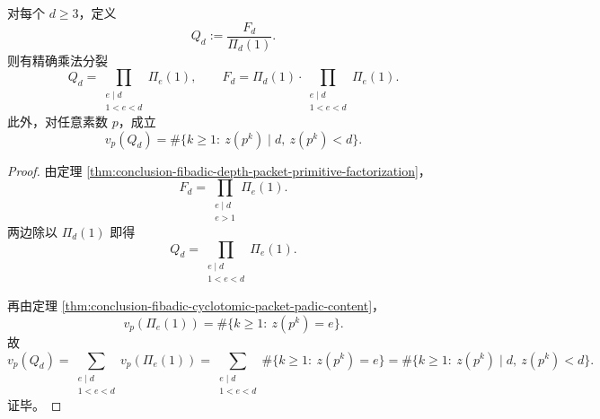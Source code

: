 \begin{theorem}[导体预算的乘法分裂]\label{thm:conclusion-fibadic-conductor-budget-new-old-splitting}
对每个 \(d\ge 3\)，定义
\[
Q_d:=\frac{F_d}{\Pi_d(1)}.
\]
则有精确乘法分裂
\[
Q_d=\prod_{\substack{e\mid d\\ 1<e<d}}\Pi_e(1),
\qquad
F_d=\Pi_d(1)\cdot \prod_{\substack{e\mid d\\ 1<e<d}}\Pi_e(1).
\]
此外，对任意素数 \(p\)，成立
\[
v_p(Q_d)
=
\#\{k\ge 1:\ z(p^k)\mid d,\ z(p^k)<d\}.
\]
\end{theorem}
\begin{proof}
由定理 \ref{thm:conclusion-fibadic-depth-packet-primitive-factorization}，
\[
F_d=\prod_{\substack{e\mid d\\ e>1}}\Pi_e(1).
\]
两边除以 \(\Pi_d(1)\) 即得
\[
Q_d=\prod_{\substack{e\mid d\\ 1<e<d}}\Pi_e(1).
\]

再由定理 \ref{thm:conclusion-fibadic-cyclotomic-packet-padic-content}，
\[
v_p(\Pi_e(1))
=
\#\{k\ge 1:\ z(p^k)=e\}.
\]
故
\[
v_p(Q_d)
=
\sum_{\substack{e\mid d\\ 1<e<d}}v_p(\Pi_e(1))
=
\sum_{\substack{e\mid d\\ 1<e<d}}
\#\{k\ge 1:\ z(p^k)=e\}
=
\#\{k\ge 1:\ z(p^k)\mid d,\ z(p^k)<d\}.
\]
证毕。
\end{proof}

